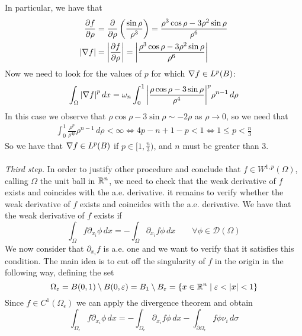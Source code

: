 In particular, we have that
\begin{align*}
    \frac{\partial f}{\partial \rho} & = \frac{\partial }{\partial \rho}\left(\frac{\sin\rho}{\rho^3}\right) = \frac{\rho^3 \cos\rho  - 3  \rho^2 \sin\rho}{\rho^6} \\
    \abs{\nabla f}                    & = \abs{\frac{\partial f}{\partial \rho}} = \abs{\frac{\rho^3 \cos\rho  - 3 \rho^2 \sin\rho }{\rho^6}}
\end{align*}
Now we need to look for the values of $p$ for which \(\nabla f \in L^p(B)\):
\begin{equation*}
    \int_\Omega \abs{\nabla f}^p \, dx = \omega_n \int_0^1 \abs{\frac{\rho \cos\rho  - 3 \sin\rho }{\rho^4}}^p \rho^{n-1} \, d\rho \\
\end{equation*}
In this case we observe that $\rho \cos\rho  - 3 \sin\rho \sim -2\rho$ as $\rho \to 0$, so we need that
\[
    \begin{split}
        \int_0^1 \frac{\rho^p} {\rho^{4p}} \rho^{n-1} \, d\rho < \infty \iff 4p - n + 1 - p < 1 \iff 1 \leq p < \frac{n}{3}
    \end{split}
\]
So we have that \(\nabla f \in L^p(B)\) if \(p \in [1, \frac{n}{3})\), and $n$
must be greater than 3.\\ \vspace{0.1cm}\\ \textit{Third step.} In order to
justify other procedure and conclude that $f \in W^{1,p}(\Omega)$, calling
$\Omega$ the unit ball in $\mathbb{R}^n$, we need to check that the weak derivative
of \(f\) exists and coincides with the a.e. derivative. it remains to verify
whether the weak derivative of \(f\) exists and coincides with the a.e.
derivative. We have that the weak derivative of \(f\) exists if
\begin{equation}\label{eq:weak_derivative}
    \int_\Omega f \partial_{x_i} \phi \, dx = - \int_\Omega \partial_{x_i} f \phi \, dx \qquad \forall \phi \in \mathcal{D}(\Omega)
\end{equation}
We now consider that $\partial_{x_i} f$ is a.e. one and we want to verify that it satisfies this condition.
The main idea is to cut off the singularity of \(f\) in the origin in the following way, defining the set
\[
    \Omega_\varepsilon = B(0, 1) \setminus B(0, \varepsilon) = B_1 \setminus B_\varepsilon = \left\{ x \in \mathbb{R}^n \mid \varepsilon < \abs{x} < 1 \right\}
\]
Since \(f \in C^1(\Omega_\epsilon)\) we can apply the divergence theorem and
obtain
\begin{equation}\label{eq:divergence}
    \int_{\Omega_\epsilon} f \partial_{x_i} \phi \, dx = -\int_{\Omega_\epsilon} \partial_{x_i} f \phi \, dx - \int_{\partial\Omega_\epsilon} f \phi \nu_i \, d\sigma
\end{equation}
